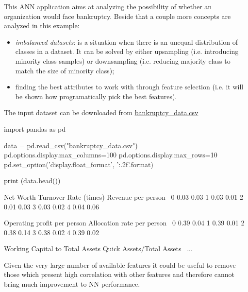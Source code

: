 This ANN application aims at analyzing the possibility of whether an organization would face bankruptcy. Beside that a couple more concepts are analyzed in this example:
\begin{itemize}
\item \emph{imbalanced datasets}: is a situation when there is an unequal distribution of classes in a dataset. It can be solved by either upsampling (i.e. introducing minority class samples) or downsampling (i.e. reducing majority class to match the size of minority class);
\item finding the best attributes to work with through feature selection (i.e. it will be shown how programatically pick the best features).
\end{itemize}

The input dataset can be downloaded from \href{https://raw.githubusercontent.com/matteosan1/finance_course/develop/libro/input_files/bankruptcy_data.csv}{bankruptcy\_data.csv}
\begin{ipython}
import pandas as pd
	
data = pd.read_csv("bankruptcy_data.csv")
pd.options.display.max_columns=100
pd.options.display.max_rows=10
pd.set_option('display.float_format', '{:.2f}'.format)
	
print (data.head())
\end{ipython}
\begin{ioutput}
Net Worth Turnover Rate (times)  Revenue per person  \
0                          0.03                0.03   
1                          0.03                0.01   
2                          0.01                0.03   
3                          0.03                0.02   
4                          0.04                0.06   
	
Operating profit per person  Allocation rate per person  \
0                      0.39                        0.04   
1                      0.39                        0.01   
2                      0.38                        0.14   
3                      0.38                        0.02   
4                      0.39                        0.02   

Working Capital to Total Assets  Quick Assets/Total Assets  \
...                        
\end{ioutput}

Given the very large number of available features it could be useful to remove those which present high correlation with other features and therefore cannot bring much improvement to NN performance.

